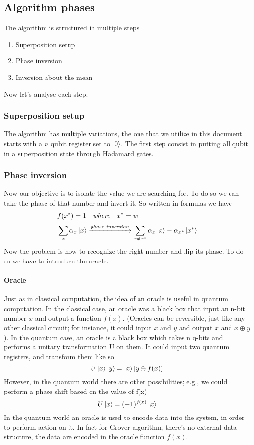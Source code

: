 \documentclass[main.tex]{subfiles}
\begin{document}
\subsection{Algorithm phases}
The algorithm is structured in multiple steps \begin{enumerate}
\item Superposition setup
\item Phase inversion
\item Inversion about the mean
\end{enumerate}
Now let's analyse each step.
\subsubsection{Superposition setup}
The algorithm has multiple variations, the one that we utilize in this document starts with a $n$ qubit register set to $\ket{0}$.
The first step consist in putting all qubit in a superposition state through Hadamard gates.
\subsubsection{Phase inversion}
Now our objective is to isolate the value we are searching for. To do so we can take the phase of that number and invert it. So written in formulas we have
\begin{align*}
& f(x^{*})=1 \quad\textit{where} \quad x^{*}=w \\
& \sum_{x}^{}\alpha_{x}\ket{x}  \xrightarrow{\textit{phase inversion}} \sum_{x\neq x^{*}}^{}\alpha_{x}\ket{x}-\alpha_{x^{*}}\ket{x^{*}}
\end{align*}
Now the problem is how to recognize the right number and flip its phase. To do so we have to introduce the oracle.
\paragraph{Oracle} 
Just as in classical computation, the idea of an oracle is
useful in quantum computation. In the classical case,
an oracle was a black box that input an n-bit number $x$
and output a function $f(x)$. (Oracles can be reversible,
just like any other classical circuit; for instance, it could
input $x$ and $y$ and output $x$ and $x\oplus y$).
In the quantum case, an oracle is a black box which
takes n q-bits and performs a unitary transformation U on them. It could input two quantum registers, and
transform them like so 
$$U\ket{x}\ket{y} = \ket{x}\ket{y \oplus f(x)}$$
However, in the quantum world there are other possibilities; e.g., we could perform a phase shift based on the value of f(x)
$$U\ket{x} = (-1)^{f(x)}\ket{x}$$
In the quantum world an oracle is used to encode data into the system, in order to perform action on it. In fact for Grover algorithm, there's no external data structure, the data are encoded in the oracle function $f(x)$.
\end{document}
